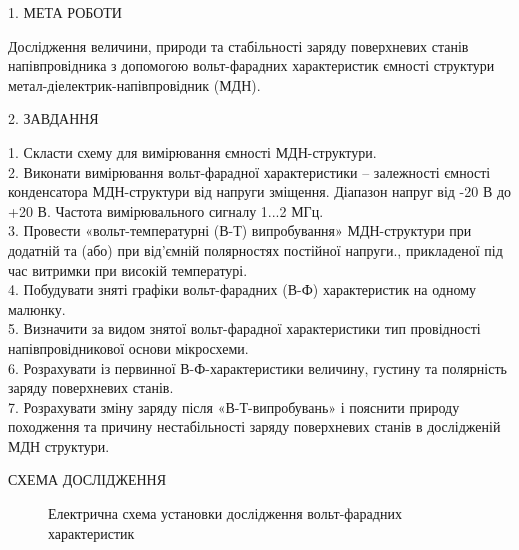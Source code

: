 \documentclass[a4paper,14pt]{extreport}
\begin{document}
\begin{center}1. МЕТА РОБОТИ\\ \end{center}

Дослідження величини, природи та стабільності заряду поверхневих
станів напівпровідника з допомогою вольт-фарадних характеристик ємності
структури метал-діелектрик-напівпровідник (МДН).

\begin{center}2. ЗАВДАННЯ\\ \end{center}

	1. Скласти схему для вимірювання ємності МДН-структури.\\

	2. Виконати вимірювання вольт-фарадної характеристики – залежності 
	ємності конденсатора МДН-структури від напруги зміщення. Діапазон напруг 
	від -20 В до +20 В. Частота вимірювального сигналу 1...2 МГц.\\

	3. Провести «вольт-температурні (В-Т) випробування» МДН-структури 
	при додатній та (або) при від’ємній полярностях постійної напруги., 
	прикладеної під час витримки при високій температурі.\\

	4. Побудувати зняті графіки вольт-фарадних (В-Ф) характеристик на 
	одному малюнку.\\

	5. Визначити за видом знятої вольт-фарадної характеристики тип 
	провідності напівпровідникової основи мікросхеми.\\

	6. Розрахувати із первинної В-Ф-характеристики величину, густину та 
	полярність заряду поверхневих станів.\\

	7. Розрахувати зміну заряду після «В-Т-випробувань» і пояснити природу 
	походження та причину нестабільності заряду поверхневих станів в 
	дослідженій МДН структури.



\newpage
\begin{center}СХЕМА ДОСЛІДЖЕННЯ\\ \end{center}

\begin{figure}[h]
\caption{Електрична схема установки дослідження вольт-фарадних 
характеристик}
\label{ris1}
\end{figure}
\end{document}
